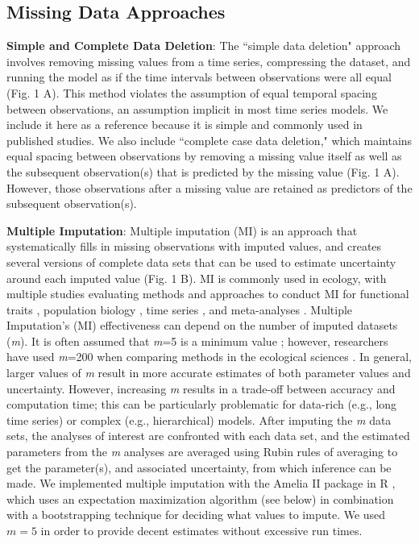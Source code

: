 \documentclass[12pt,english]{article} %
\begin{document}
\subsection*{Missing Data Approaches} 
\textbf{Simple and Complete Data Deletion}: The ``simple data deletion" approach involves removing missing values from a time series, compressing the dataset, and running the model as if the time intervals between observations were all equal (Fig. 1 A). This method violates the assumption of equal temporal spacing between observations, an assumption implicit in most time series models. We include it here as a reference because it is simple and commonly used in published studies. We also include ``complete case data deletion," which maintains equal spacing between observations by removing a missing value itself as well as the subsequent observation(s) that is predicted by the missing value (Fig. 1 A). However, those observations after a missing value are retained as predictors of the subsequent observation(s). 

\textbf{Multiple Imputation}: Multiple imputation (MI) is an approach that systematically fills in missing observations with imputed values, and creates several versions of complete data sets that can be used to estimate uncertainty around each imputed value (Fig. 1 B). MI is commonly used in ecology, with multiple studies evaluating methods and approaches to conduct MI for functional traits \citep{taugourdeau_filling_2014,johnson_handling_2021,penone_imputation_2014}, population biology \citep{onkelinx_working_2017}, time series \citep{hui_gap-filling_2004}, and meta-analyses \citep{ellington_using_2015}. Multiple Imputation’s (MI) effectiveness can depend on the number of imputed datasets (\textit{m}). It is often assumed that \textit{m}=5 is a minimum value \citep{honaker_what_2010}; however, researchers have used \textit{m}=200 when comparing methods in the ecological sciences \citep{onkelinx_working_2017}. In general, larger values of \textit{m} result in more accurate estimates of both parameter values and uncertainty. However, increasing \textit{m} results in a trade-off between accuracy and computation time; this can be particularly problematic for data-rich (e.g., long time series) or complex (e.g., hierarchical) models. 
After imputing the \textit{m} data sets, the analyses of interest are confronted with each data set, and the estimated parameters from the \textit{m} analyses are averaged using Rubin rules of averaging to get the parameter(s), and associated uncertainty, from which inference can be made. We implemented multiple imputation with the Amelia II package in R \citep{honaker2011}, which uses an expectation maximization algorithm (see below) in combination with a bootstrapping technique for deciding what values to impute. We used $m=5$ in order to provide decent estimates without excessive run times.
\end{document}
